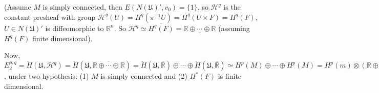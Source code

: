 \documentclass{article}
\theoremstyle{mystyle}
\theoremstyle{remark}
\numberwithin{equation}{section}
\begin{document}
(Assume $M$ is simply connected, then $E(N(\mathfrak{U})',v_0) = \{1\}$, so $\mathcal{H}^q$ is the constant presheaf with group $\mathcal{H}^q(U) = H^q(\pi^{-1}U) = H^q(U\times F) = H^q(F)$, $U\in N(\mathfrak{U})'$ is diffeomorphic to $\mathbb{R}^n$. So $\mathcal{H}^q\simeq \overline{H^q(F)} = \underline{\mathbb{R}\oplus \cdots \oplus\mathbb{R}}$ (assuming $H^q(F)$ finite dimensional).

Now, $E^{p,q}_2 = \check{H}(\mathfrak{U},\mathcal{H}^q) = \check{H}(\mathfrak{U},\overline{\mathbb{R}\oplus \cdots \oplus \mathbb{R}}) = \check{H}(\mathfrak{U},\overline{\mathbb{R}})\oplus \cdots \oplus 
\check{H}(\mathfrak{U},\overline{\mathbb{R}})\simeq H^p(M)\oplus \cdots \oplus H^p(M)
=H^p(m)\otimes (\mathbb{R}\oplus \cdots \oplus \mathbb{R}) = H^p(M)\otimes H^q(F)$, under two hypothesis: (1) $M$ is simply connected and (2) $H^*(F)$ is finite dimensional.










	
\end{document}
